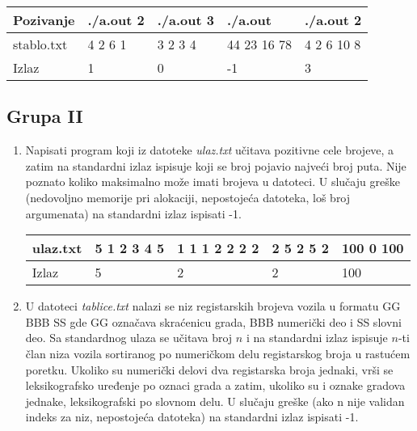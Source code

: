 \begin{enumerate}
\small
\begin{tabular}{ |l|l|l|l|l| }
\hline 
  
  Pozivanje & ./a.out 2 & ./a.out 3 & ./a.out & ./a.out 2 \\ \hline
  stablo.txt & 4 2 6 1  & 3 2 3 4 & 44 23 16 78 & 4 2 6 10 8 \\ \hline
  
  Izlaz & 1 & 0 & -1 & 3 \\ \hline 
\end{tabular}
\normalsize
\end{enumerate}

\subsection{Grupa II}

\begin{enumerate}


\item  Napisati program koji iz datoteke \textit{ulaz.txt} u\v citava pozitivne cele brojeve, a zatim na standardni izlaz ispisuje koji se broj pojavio najve\' ci broj puta. Nije poznato koliko maksimalno mo\v ze imati brojeva u datoteci. U slu\v caju gre\v ske (nedovoljno memorije pri alokaciji, nepostoje\' ca datoteka, lo\v s broj argumenata) na standardni izlaz ispisati -1.

\small
\begin{tabular}{ |l|l|l|l|l| }
\hline 
  ulaz.txt  & 5 1 2 3 4 5  & 1 1 1 2 2 2 2 & 2 5 2 5 2 & 100 0 100 \\ \hline 
  Izlaz & 5 & 2 & 2 & 100 \\ \hline 
\end{tabular}
\normalsize

\item U datoteci \textit{tablice.txt} nalazi se niz registarskih brojeva vozila u formatu GG BBB SS gde GG ozna\v cava skra\' cenicu grada, BBB numeri\v cki deo i SS slovni deo. Sa standardnog ulaza se u\v citava broj $n$ i na standardni izlaz ispisuje $n$-ti \v clan niza vozila sortiranog po numeri\v ckom delu registarskog broja u rastu\' cem poretku. Ukoliko su numeri\v cki delovi dva registarska broja jednaki, vr\v si se leksikografsko uređenje po oznaci grada a zatim, ukoliko su i oznake gradova jednake, leksikografski po slovnom delu. U slu\v caju gre\v ske (ako n nije validan indeks za niz, nepostoje\' ca datoteka) na standardni izlaz ispisati -1. 


\end{enumerate}
